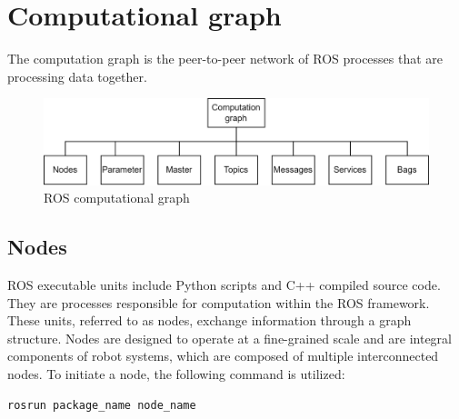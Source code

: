 \section{Computational graph}

The computation graph is the peer-to-peer network of ROS processes that are processing data together.
\begin{figure}[H]
    \centering
    \includegraphics[width=0.75\linewidth]{images/cg.png}
    \caption{ROS computational graph}
\end{figure}

\subsection{Nodes}
ROS executable units include Python scripts and C++ compiled source code. 
They are processes responsible for computation within the ROS framework. 
These units, referred to as nodes, exchange information through a graph structure. 
Nodes are designed to operate at a fine-grained scale and are integral components of robot systems, which are composed of multiple interconnected nodes.
To initiate a node, the following command is utilized:
\begin{verbatim}
rosrun package_name node_name
\end{verbatim}

